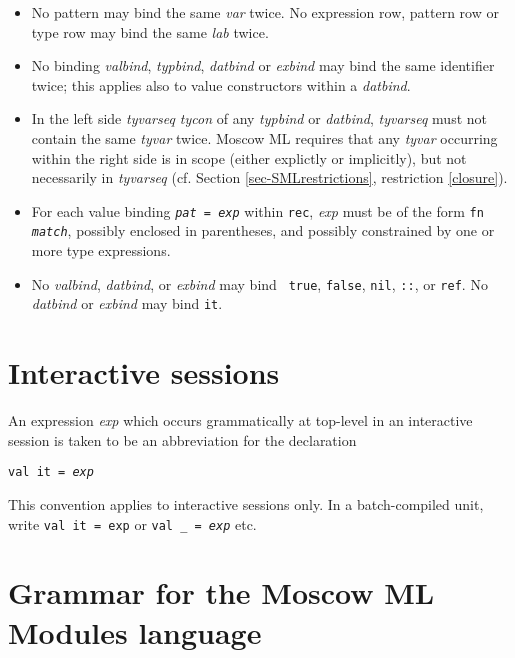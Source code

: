 \documentclass[fleqn]{article}
\begin{document}
\begin{itemize}
\item No pattern may bind the same {\it var\/} twice.  No expression
  row, pattern row or type row may bind the same {\it lab\/} twice.

\item No binding {\it valbind\/}, {\it typbind\/}, {\it datbind\/} or
  {\it exbind\/} may bind the same identifier twice; this applies also
  to value constructors within a {\it datbind\/}.
        
\item In the left side {\it tyvarseq tycon\/} of any {\it typbind\/}
  or {\it datbind\/}, {\it tyvarseq\/} must not contain the same {\it
    tyvar\/} twice.  
    Moscow ML 
    requires that   any {\it tyvar\/} occurring within the right side
    is in scope (either explictly or implicitly), but not necessarily in
    {\it tyvarseq} (cf. Section \ref{sec-SMLrestrictions}, restriction \ref{closure}).

\item For each value binding {\tt {\it pat\/} = {\it exp\/}} within
  {\tt rec}, {\it exp\/} must be of the form {\tt fn {\it match\/}},
  possibly enclosed in parentheses, and possibly constrained by one or
  more type expressions.
  
\item No {\it valbind}, {\it datbind}, or {\it exbind} may bind {\tt
    true}, {\tt false}, {\tt nil}, {\tt ::}, or {\tt ref}.  No {\it
    datbind} or {\it exbind} may bind {\tt it}.


\end{itemize}


\section{Interactive sessions}

An expression {\it exp\/} which occurs grammatically at top-level in
an interactive session is taken to be an abbreviation for the
declaration

\begin{quot}
{\tt val it = {\it exp\/}}  
\end{quot}

\noindent This convention applies to interactive sessions only.  In a
batch-compiled unit, write {\tt val it = {\tt exp}} or {\tt val \verb#_# =
  {\it exp\/}} etc.

\newpage


\section{Grammar for the Moscow ML Modules language}
\label{sec-modules}
\end{document}
